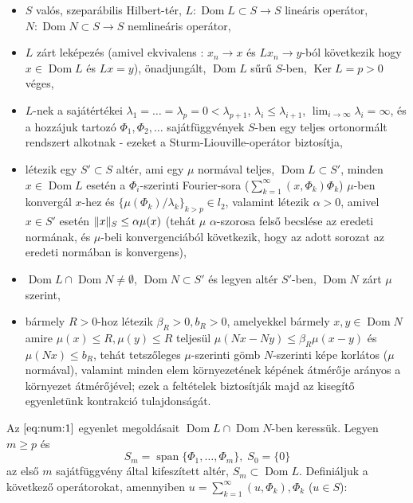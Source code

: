 \documentclass[oneside, titlepage, 12pt, a4paper]{report}
\DeclareMathOperator{\Ker}{Ker}	%
\DeclareMathOperator{\Dom}{Dom}	%
\DeclareMathOperator{\Span}{span}	%
\DeclarePairedDelimiter\norm{\lVert}{\rVert}	%
\begin{document}
\begin{itemize}
\item $S$ valós, szeparábilis Hilbert-tér, $L : \Dom L \subset S \rightarrow S$ lineáris operátor, $N : \Dom N \subset S \rightarrow S$ nemlineáris operátor,
\item $L$ zárt leképezés (amivel ekvivalens \cite{funkanal}: $x_n \rightarrow x$ és $Lx_n \rightarrow y$-ból következik hogy $x \in \Dom L$ és $Lx = y$), önadjungált, $\Dom L$ sűrű $S$-ben, $\Ker L = p > 0$ véges,
\item $L$-nek a sajátértékei $\lambda_1 = \dots = \lambda_p = 0 < \lambda_{p + 1}$, $\lambda_i \leq \lambda_{i + 1}$, $\lim_{i \to \infty} \lambda_i = \infty$, és a hozzájuk tartozó $\Phi_1, \Phi_2, \dots$ sajátfüggvények $S$-ben egy teljes ortonormált rendszert alkotnak - ezeket a Sturm-Liouville-operátor biztosítja, %
\item létezik egy $S' \subset S$ altér, ami egy $\mu$ normával teljes, $\Dom L \subset S'$, minden $x \in \Dom L$ esetén a $\Phi_i$-szerinti Fourier-sora ($\sum_{k=1}^\infty (x, \Phi_k) \Phi_k$) $\mu$-ben konvergál $x$-hez és $\{ \mu(\Phi_k) / \lambda_k\}_{k > p} \in l_2$, valamint létezik $\alpha > 0$, amivel $x \in S'$ esetén $\norm {x}_S \leq \alpha \mu(x)$ (tehát $\mu$ $\alpha$-szorosa felső becslése az eredeti normának, és $\mu$-beli konvergenciából következik, hogy az adott sorozat az eredeti normában is konvergens),
\item $\Dom L \cap \Dom N \neq \emptyset$, $\Dom N \subset S'$ és legyen altér $S'$-ben, $\Dom N$ zárt $\mu$ szerint,
\item bármely $R > 0$-hoz létezik $\beta_R > 0, b_R > 0$, amelyekkel bármely $x, y \in \Dom N$ amire $\mu(x) \leq R, \mu(y) \leq R$ teljesül $\mu(Nx - Ny) \leq \beta_R \mu(x - y)$ és $\mu(Nx) \leq b_R$, tehát tetszőleges $\mu$-szerinti gömb $N$-szerinti képe korlátos ($\mu$ normával), valamint minden elem környezetének képének átmérője arányos a környezet átmérőjével; ezek a feltételek biztosítják majd az kisegítő egyenletünk kontrakció tulajdonságát. %
\end{itemize}
Az $\eqref{eq:num:1}$ egyenlet megoldásait $\Dom L \cap \Dom N$-ben keressük. Legyen $m \geq p$ és
\begin{equation*}
S_m = \Span \{\Phi_1, \dots, \Phi_m \}, \; S_0 = \{ 0\}
\end{equation*}
az első $m$ sajátfüggvény által kifeszített altér, $S_m \subset \Dom L$. Definiáljuk a következő operátorokat, amennyiben $u = \sum_{k = 1}^\infty (u, \Phi_k), \Phi_k$ ($u \in S$):
\end{document}
